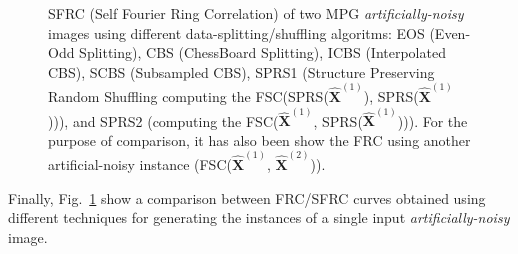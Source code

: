 \documentclass{article}
\begin{document}
\begin{figure}
  \centering
  \caption{SFRC (Self Fourier Ring Correlation) of two MPG
    \emph{artificially-noisy} images using different
    data-splitting/shuffling algoritms: EOS (Even-Odd Splitting), CBS
    (ChessBoard Splitting), ICBS (Interpolated CBS), SCBS (Subsampled
    CBS), SPRS1 (Structure Preserving Random Shuffling computing the
    FSC(SPRS($\hat{\mathbf{X}}^{(1)}$),
    SPRS($\hat{\mathbf{X}}^{(1)}$))), and SPRS2 (computing the
    FSC($\hat{\mathbf{X}}^{(1)}$,
    SPRS($\hat{\mathbf{X}}^{(1)}$))). For the purpose of comparison,
    it has also been show the FRC using another artificial-noisy
    instance (FSC($\hat{\mathbf{X}}^{(1)}$,
    $\hat{\mathbf{X}}^{(2)}$)).\label{fig:SFC_vs_splitting_artificial}}
\end{figure}

Finally, Fig.~\ref{fig:SFC_vs_splitting_artificial} show a comparison
between FRC/SFRC curves obtained using different techniques for
generating the instances of a single input \emph{artificially-noisy}
image.

\end{document}
